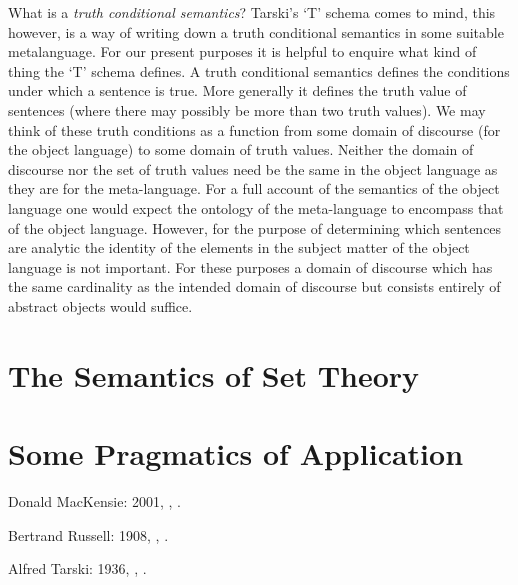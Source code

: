 \documentclass{rbjk}
\begin{document}
\begin{article}
What is a {\it truth conditional semantics}?
Tarski's `T' schema comes to mind, this however, is a way of writing down a truth conditional semantics in some suitable metalanguage.
For our present purposes it is helpful to enquire what kind of thing the `T' schema defines. 
A truth conditional semantics defines the conditions under which a sentence is true.
More generally it defines the truth value of sentences (where there may possibly be more than two truth values).
We may think of these truth conditions as a function from some domain of discourse (for the object language) to some domain of truth values.
Neither the domain of discourse nor the set of truth values need be the same in the object language as they are for the meta-language.
For a full account of the semantics of the object language one would expect the ontology of the meta-language to encompass that of the object language.
However, for the purpose of determining which sentences are analytic the identity of the elements in the subject matter of the object language is not important.
For these purposes a domain of discourse which has the same cardinality as the intended domain of discourse but consists entirely of abstract objects would suffice.





\section{The Semantics of Set Theory}

\section{Some Pragmatics of Application}

\begin{thebibliography}{}

Donald MacKensie: 2001,
,
.

Bertrand Russell: 1908,
,
.

Alfred Tarski: 1936,
,
.

\end{thebibliography}
\end{article}
\end{document}
